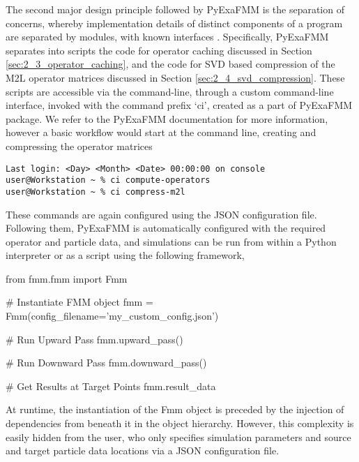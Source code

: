 The second major design principle followed by \gls{PyExaFMM} is
the separation of concerns, whereby implementation details of distinct
components of a program are separated by modules, with known interfaces
\cite{Gamma:1994:Addison}. Specifically, \gls{PyExaFMM} separates into scripts
the code for operator caching discussed in Section \ref{sec:2_3_operator_caching},
and the code for SVD based compression of the M2L operator matrices discussed in
Section \ref{sec:2_4_svd_compression}. These scripts are accessible via the
command-line, through a custom command-line interface, invoked with the command
prefix `ci', created as a part of \gls{PyExaFMM} package. We refer to the \gls{PyExaFMM} documentation for more information,
however a basic workflow would start at the command line, creating and compressing
the operator matrices

\begin{verbatim}
Last login: <Day> <Month> <Date> 00:00:00 on console
user@Workstation ~ % ci compute-operators
user@Workstation ~ % ci compress-m2l
\end{verbatim}

These commands are again configured using the \gls{JSON} configuration file.
Following them, \gls{PyExaFMM} is automatically configured with the required
operator and particle data, and simulations can be run from within a Python
interpreter or as a script using the following framework,

\begin{python}
from fmm.fmm import Fmm

# Instantiate FMM object
fmm = Fmm(config_filename='my_custom_config.json')

# Run Upward Pass
fmm.upward_pass()

# Run Downward Pass
fmm.downward_pass()

# Get Results at Target Points
fmm.result_data
\end{python}

At runtime, the instantiation of the Fmm object is preceded by the injection of
dependencies from beneath it in the object hierarchy. However, this complexity is
easily hidden from the user, who only specifies simulation parameters and source
and target particle data locations via a \gls{JSON} configuration file.
